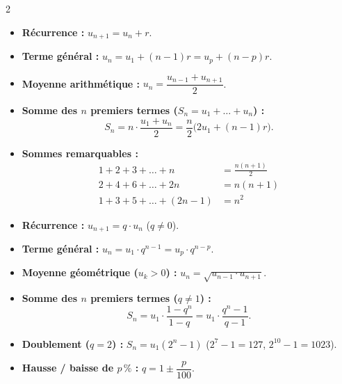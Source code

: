 {\fontsize{9.5pt}{11.5pt}\selectfont
\setlength{\columnsep}{18pt}
\begin{multicols}{2}

\begin{itemize}[leftmargin=1.2em, itemsep=1.5pt, topsep=2pt]
    \item \textbf{Récurrence :} $u_{n+1} = u_n + r$.
    \item \textbf{Terme général :} $u_n = u_1 + (n - 1)r = u_p + (n - p)r$.
    \item \textbf{Moyenne arithmétique :} $u_n = \dfrac{u_{n-1} + u_{n+1}}{2}$.
    \item \textbf{Somme des $n$ premiers termes ($S_n = u_1 + \dots + u_n$) :}
    \[
        \boxed{S_n = n \cdot \frac{u_1 + u_n}{2} = \frac{n}{2}\bigl(2u_1 + (n - 1)r\bigr)}.
    \]
    \item \textbf{Sommes remarquables :}
    \begin{align*}
        1 + 2 + 3 + \dots + n &= \frac{n(n+1)}{2} \\
        2 + 4 + 6 + \dots + 2n &= n(n+1) \\
        1 + 3 + 5 + \dots + (2n-1) &= n^2
    \end{align*}
\end{itemize}

\vspace{3pt}
\begin{itemize}[leftmargin=1.2em, itemsep=1.5pt, topsep=2pt]
    \item \textbf{Récurrence :} $u_{n+1} = q \cdot u_n$ ($q \neq 0$).
    \item \textbf{Terme général :} $u_n = u_1 \cdot q^{n-1} = u_p \cdot q^{n-p}$.
    \item \textbf{Moyenne géométrique ($u_k > 0$) :} $u_n = \sqrt{u_{n-1}\cdot u_{n+1}}$.
    \item \textbf{Somme des $n$ premiers termes ($q \neq 1$) :}
    \[
        \boxed{S_n = u_1 \cdot \frac{1 - q^n}{1 - q} = u_1 \cdot \frac{q^n - 1}{q - 1}}.
    \]
    \item \textbf{Doublement ($q = 2$) :} $S_n = u_1(2^n - 1)$ ($2^7 - 1 = 127$, $2^{10} - 1 = 1023$).
    \item \textbf{Hausse / baisse de $p\,\%$ :} $q = 1 \pm \dfrac{p}{100}$.
\end{itemize}

\columnbreak


\end{multicols}}
